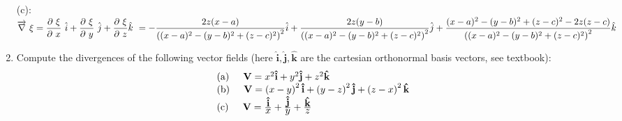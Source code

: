 \documentclass[fleqn]{article}
\begin{document}
\begin{enumerate}
      \textcolor{hwColor}{
        (c): \\ 
        $
          \overrightarrow{\nabla} \xi=\dfrac{\partial \xi}{\partial x} \hat{i}+\dfrac{\partial \xi}{\partial y} \hat{j}+\dfrac{\partial \xi}{\partial z}\hat{k} \\ 
          =-\dfrac{2z(x-a)}{\left((x-a)^2-(y-b)^2+(z-c)^2\right)^2} \hat{i} \\ \\   
          +\dfrac{2z(y-b)}{\left((x-a)^2-(y-b)^2+(z-c)^2\right)^2} \hat{j} \\ \\
          +\dfrac{(x-a)^2-(y-b)^2+(z-c)^2-2z(z-c)}{\left((x-a)^2-(y-b)^2+(z-c)^2\right)^2} \hat{k}
        $ \\ 
      }
   
    \item \label{ex.b} Compute the divergences of the following vector fields (here $\mathbf{\hat{i}},\mathbf{\hat{j}},\mathbf{\hat{k}}$ are the cartesian orthonormal basis vectors, see textbook): 
    \[
    \begin{array}{lll}
     & {\rm (a)\hspace{0.2in}}\mathbf{V}=x^{2}\mathbf{\hat{i}}+y^{2}\mathbf{\hat{j}}+z^{2}\mathbf{\hat{k}} \\ 
     & {\rm (b)\hspace{0.2in}}\mathbf{V}=\left(x-y\right) ^{2}\mathbf{\hat{i}}+\left( y-z\right) ^{2}\mathbf{\hat{j}}+\left( z-x\right) ^{2}\mathbf{\hat{k}} \\ 
     & {\rm (c)\hspace{0.2in}}\mathbf{V}=\frac{\textstyle \mathbf{\hat{i}}}{\textstyle x}+\frac{\textstyle \mathbf{\hat{j}}}{\textstyle y}+\frac{\textstyle \mathbf{\hat{k}}}{\textstyle z}
    \end{array}
    \]


\end{enumerate}
\end{document}

